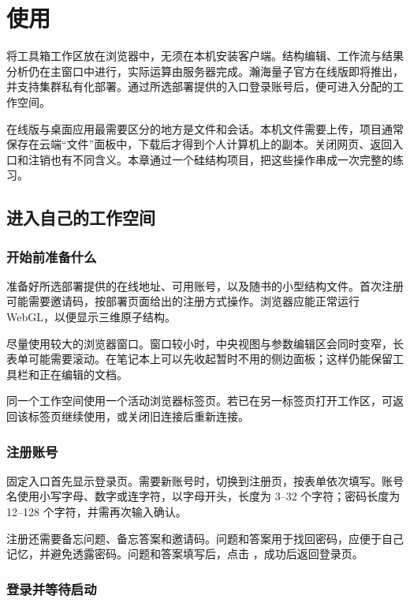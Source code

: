 \chapter{使用 \headinglatin{\ksonline}}\label{ch:online}

\ksonline{} 将工具箱工作区放在浏览器中，无须在本机安装客户端。结构编辑、工作流与结果分析仍在主窗口中进行，实际运算由服务器完成。瀚海量子\regmark{}官方在线版即将推出，并支持集群私有化部署。通过所选部署提供的入口登录账号后，便可进入分配的工作空间。

在线版与桌面应用最需要区分的地方是文件和会话。本机文件需要上传，项目通常保存在云端“文件”面板中，下载后才得到个人计算机上的副本。关闭网页、返回入口和注销也有不同含义。本章通过一个硅结构项目，把这些操作串成一次完整的练习。

\section{进入自己的工作空间}

\subsection{开始前准备什么}

准备好所选部署提供的在线地址、可用账号，以及随书的小型结构文件。首次注册可能需要邀请码，按部署页面给出的注册方式操作。浏览器应能正常运行 WebGL，以便显示三维原子结构。

尽量使用较大的浏览器窗口。窗口较小时，中央视图与参数编辑区会同时变窄，长表单可能需要滚动。在笔记本上可以先收起暂时不用的侧边面板；这样仍能保留工具栏和正在编辑的文档。

同一个工作空间使用一个活动浏览器标签页。若已在另一标签页打开工作区，可返回该标签页继续使用，或关闭旧连接后重新连接。

\subsection{注册账号}

固定入口首先显示登录页。需要新账号时，切换到注册页，按表单依次填写。账号名使用小写字母、数字或连字符，以字母开头，长度为 3--32 个字符；密码长度为 12--128 个字符，并需再次输入确认。

注册还需要备忘问题、备忘答案和邀请码。问题和答案用于找回密码，应便于自己记忆，并避免透露密码。问题和答案填写后，点击 ，成功后返回登录页。


\subsection{登录并等待启动}

